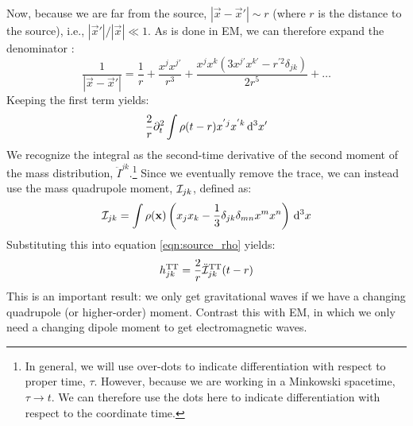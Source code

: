 Now, because we are far from the source, $|\vec{x} - \vec{x}'| \sim r$ (where $r$ is the distance to the source), i.e., $|\vec{x}'|/|\vec{x}| \ll 1$. As is done in \ac{EM}, we can therefore expand the denominator \cite{BlanfordThorne}:
\begin{equation}
\label{eqn:expansion}
\frac{1}{|\vec{x} - \vec{x}'|} = \frac{1}{r} + \frac{x^{j}x^{j'}}{r^3} + \frac{x^j x^k (3x^{j'}x^{k'} - r^{'2}\delta_{jk})}{2r^5} + \ldots
\end{equation}
Keeping the first term yields:
\begin{equation*}
\frac{2}{r} \partial_t^2 \int \rho(t - r) x^{'j}x^{'k} \,\mathrm{d}^3 x'
\end{equation*}
We recognize the integral as the second-time derivative of the second moment of the mass distribution, $\ddot{I}^{jk}$.\footnote{In general, we will use over-dots to indicate differentiation with respect to proper time, $\tau$. However, because we are working in a Minkowski spacetime, $\tau \rightarrow t$. We can therefore use the dots here to indicate differentiation with respect to the coordinate time.} Since we eventually remove the trace, we can instead use the mass quadrupole moment, $\mathcal{I}_{jk}$, defined as:
\begin{equation}
\label{eqn:quad_moment}
\qI_{jk} = \int \rho(\mathbf{x})\left( x_j x_k - \frac{1}{3} \delta_{jk} \delta_{mn} x^{m} x^{n} \right) \d^3 x
\end{equation}
Substituting this into equation \ref{eqn:source_rho} yields:
\begin{equation}
\label{eqn:h_mass_quad}
h^{\TT}_{jk} = \frac{2}{r} \ddot{\qI}_{jk}^\TT(t - r)
\end{equation}
This is an important result: we only get gravitational waves if we have a changing quadrupole (or higher-order) moment. Contrast this with \ac{EM}, in which we only need a changing dipole moment to get electromagnetic waves.

